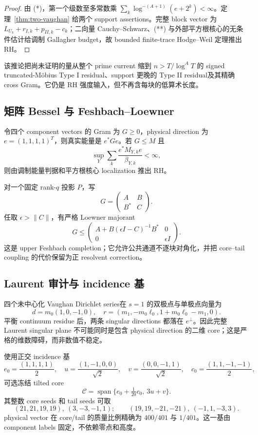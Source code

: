 \documentclass[UTF8,11pt,a4paper]{ctexart}
\theoremstyle{definition}
\theoremstyle{remark}
\newcommand{\1}{\mathbf 1}
\newcommand{\cC}{\mathcal C}
\begin{document}
\begin{proof}
由 (*)，第一个级数至多常数乘
$\sum_k\log^{-(A+1)}(e+2^k)<\infty$。定理~\ref{thm:two-vaughan} 给两个 support assertions。完整 block vector 为 $L_{U_k}+r_{I,k}+p_{II,k}-c_k$；二向量 Cauchy--Schwarz、(**) 与外部平方根核心的无条件估计给调制 Gallagher budget，故 bounded finite-trace Hodge--Weil 定理推出 RH。
\end{proof}

该推论把尚未证明的量从整个 prime current 缩到 $n>T/\log^A T$ 的 signed truncated-M\"obius Type I residual、support 更晚的 Type II residual及其精确 cross Gram。它仍是 RH 强度输入，但不再含每块的低算术长度。
\subsection{矩阵 Bessel 与 Feshbach--Loewner}

令四个 component vectors 的 Gram 为 $G\geq0$，physical direction 为 $e=(1,1,1,1)^T$，则真实能量是 $e^*Ge$。若 $G\leq M$ 且
\[
  \sup_Y\sum_k\frac{e^*M_{Y,k}e}{\beta_{Y,k}}<\infty,
\]
则由调制能量判据和平方根核心 localization 推出 RH。

对一个固定 rank-$q$ 投影 $P$，写
\[
  G=\begin{pmatrix}A&B\\B^*&C\end{pmatrix}.
\]
任取 $\epsilon>\|C\|$，有严格 Loewner majorant
\[
 G\leq
 \begin{pmatrix}
 A+B(\epsilon I-C)^{-1}B^*&0\\0&\epsilon I
 \end{pmatrix}.
\]
这是 upper Feshbach completion；它允许公共通道不逐块对角化，并把 core--tail coupling 的代价保留为正 resolvent correction。

\subsection{Laurent 审计与 incidence 基}

四个未中心化 Vaughan Dirichlet series在 $s=1$ 的双极点与单极点向量为
\[
 d=m_0(1,0,-1,0),
\quad
 r=(m_1,-m_0\ell_0,1+m_0\ell_0-m_1,0).
\]
平衡 continuum residue 后，两条 singular directions 都落在 $e^\perp$。因此完整 Laurent singular plane 不可能同时是包含 physical direction 的二维 core；这是严格的维数障碍，而非数值不稳定。

使用正交 incidence 基
\[
 e_0=\frac{(1,1,1,1)}2,\quad
 u=\frac{(1,-1,0,0)}{\sqrt2},\quad
 v=\frac{(0,0,-1,1)}{\sqrt2},\quad
 c_0=\frac{(1,1,-1,-1)}2,
\]
可选冻结 tilted core
\[
 \cC=\operatorname{span}\{e_0+\tfrac1{20}c_0,\ 3u+v\}.
\]
其整数 core seeds 和 tail seeds 可取
\[
 (21,21,19,19),\ (3,-3,-1,1);\qquad
 (19,19,-21,-21),\ (-1,1,-3,3).
\]
physical vector 在 core/tail 的质量比例精确为 $400/401$ 与 $1/401$。这一基由 component labels 固定，不依赖零点和高度。
\end{document}
